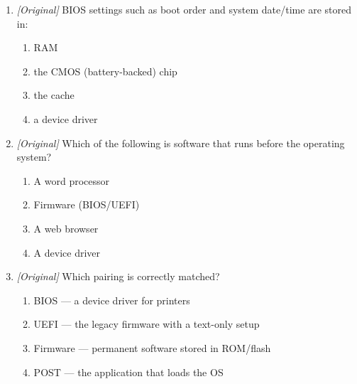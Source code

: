 \documentclass[11pt]{article}
\begin{document}
\begin{enumerate}[label=\textbf{Q\arabic*.}, leftmargin=*]
\begin{enumerate}[label=\Alph*.]
    \item I and II only
    \item I and III only
    \item II and III only
    \item I, II, and III
  \end{enumerate}
\item \textit{[Original]} BIOS settings such as boot order and system
  date/time are stored in:
  \begin{enumerate}[label=\Alph*.]
    \item RAM
    \item the CMOS (battery-backed) chip
    \item the cache
    \item a device driver
  \end{enumerate}
\item \textit{[Original]} Which of the following is software that runs before
  the operating system?
  \begin{enumerate}[label=\Alph*.]
    \item A word processor
    \item Firmware (BIOS/UEFI)
    \item A web browser
    \item A device driver
  \end{enumerate}
\item \textit{[Original]} Which pairing is correctly matched?
  \begin{enumerate}[label=\Alph*.]
    \item BIOS --- a device driver for printers
    \item UEFI --- the legacy firmware with a text-only setup
    \item Firmware --- permanent software stored in ROM/flash
    \item POST --- the application that loads the OS
  \end{enumerate}


\end{enumerate}
\end{document}
